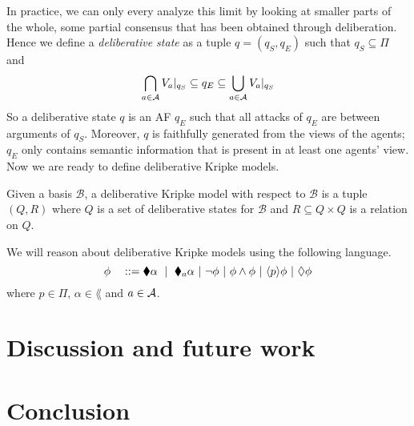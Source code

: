 \documentclass[greybox]{svmult}
\newcommand{\views}{\mathcal B}
\begin{document}
In practice, we can only every analyze this limit by looking at smaller parts of the whole, some partial consensus that has been obtained through deliberation. Hence we define a \emph{deliberative state} as a tuple $q = (q_S,q_E)$ such that $q_S \subseteq \Pi$ and 
\begin{equation}\label{eq:ds}
\bigcap_{a \in \agents}\restr {V_a} {q_S} \subseteq q_E \subseteq \bigcup_{a\in \agents} \restr{V_a}{q_S}
\end{equation}
So a deliberative state $q$ is an AF $q_E$ such that all attacks of $q_E$ are between arguments of $q_S$. Moreover, $q$ is faithfully generated from the views of the agents; $q_E$ only contains semantic information that is present in at least one agents' view. Now we are ready to define deliberative Kripke models.

\begin{definition}\label{main}
Given a basis $\views$, a deliberative Kripke model with respect to $\views$ is a tuple $(Q,R)$ where $Q$ is a set of deliberative states for $\views$ and $R \subseteq Q \times Q$ is a relation on $Q$.
\end{definition}
We will reason about deliberative Kripke models using the following language.
$$ \phi \quad ::= \cdia \alpha \ \mid \ \cdia_a \alpha ~|~ \neg \phi ~|~ \phi \wedge \phi ~|~ \ddia p \phi ~|~ \adia \phi$$ 
where $p \in \Pi$, $\alpha \in \lang$ and $a \in \mathcal A$.

\section{Discussion and future work}\label{sec:fut}

\section{Conclusion}\label{sec:conc}
\end{document}
